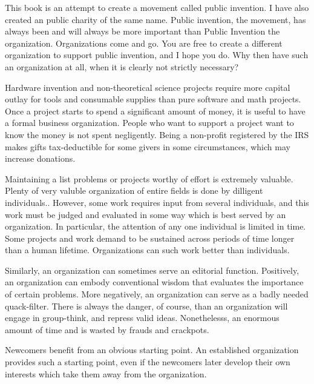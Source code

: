 \documentclass[
	fontsize=10pt, %
	twoside=false, %
	secnumdepth=1, %
]{kaobook}
\begin{document}
This book is an attempt to create a movement called public invention.
I have also created an public charity of the same name.
Public invention, the movement, has always been and will always be more important than Public Invention the organization.
Organizations come and go.
You are free to create a different organization to support public invention, and I hope you do.
Why then have such an organization at all, when it is clearly not strictly necessary?

Hardware invention and non-theoretical science projects require more capital outlay
for tools and consumable supplies than pure software and math projects.
Once a project starts to spend a significant amount of money, it is useful to have a formal business organization.
People who want to support a project want to know the money is not spent negligently.
Being a non-profit registered by the IRS makes gifts tax-deductible for some givers in some circumstances,
which may increase donations.


Maintaining a list problems or projects worthy of effort is extremely valuable.
Plenty of very valuble organization of entire fields is done by dilligent individuals..
However, some work requires input from several individuals, and this work must be judged and evaluated
in some way which is best served by an organization.
In particular, the attention of any one
individual is limited in time.
Some projects and work demand to be sustained across periods of time longer than a human lifetime.
Organizations can such work better than individuals.

Similarly, an organization can sometimes serve an editorial function.
Positively, an organization can embody conventional wisdom that
evaluates the importance of certain problems.
More negatively, an organization can serve as a badly needed quack-filter.
There is always the danger, of course, than an organization will engage in group-think,
and repress valid ideas.
Nonethelesss, an enormous amount of time and is wasted by frauds and crackpots.

Newcomers benefit from an obvious starting point.
An established organization provides such a starting point, even if the newcomers
later develop their own interests which take them away from the organization.
\end{document}
